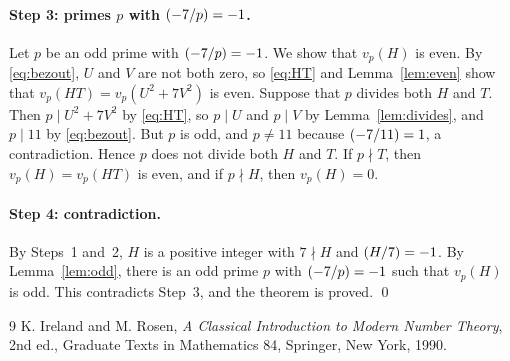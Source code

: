 \documentclass[11pt]{article}
\newcommand{\leg}[2]{\mathchoice{\biggl(\dfrac{#1}{#2}\biggr)}{(#1/#2)}{(#1/#2)}{(#1/#2)}}
\begin{document}
\paragraph{\texorpdfstring{Step 3: primes $p$ with $\leg{-7}{p}=-1$.}{Step 3: inert primes.}} Let $p$ be an odd prime with $\leg{-7}{p}=-1$. We show that $v_p(H)$ is even. By \eqref{eq:bezout}, $U$ and $V$ are not both zero, so \eqref{eq:HT} and Lemma~\ref{lem:even} show that $v_p(HT)=v_p(U^2+7V^2)$ is even. Suppose that $p$ divides both $H$ and $T$. Then $p\mid U^2+7V^2$ by \eqref{eq:HT}, so $p\mid U$ and $p\mid V$ by Lemma~\ref{lem:divides}, and $p\mid 11$ by \eqref{eq:bezout}. But $p$ is odd, and $p\neq11$ because $\leg{-7}{11}=1$, a contradiction. Hence $p$ does not divide both $H$ and $T$. If $p\nmid T$, then $v_p(H)=v_p(HT)$ is even, and if $p\nmid H$, then $v_p(H)=0$.

\paragraph{Step 4: contradiction.} By Steps~1 and~2, $H$ is a positive integer with $7\nmid H$ and $\leg{H}{7}=-1$. By Lemma~\ref{lem:odd}, there is an odd prime $p$ with $\leg{-7}{p}=-1$ such that $v_p(H)$ is odd. This contradicts Step~3, and the theorem is proved.
\qed

\begin{thebibliography}{9}
 K. Ireland and M. Rosen, \emph{A Classical Introduction to Modern Number Theory}, 2nd ed., Graduate Texts in Mathematics 84, Springer, New York, 1990.
\end{thebibliography}
\end{document}
